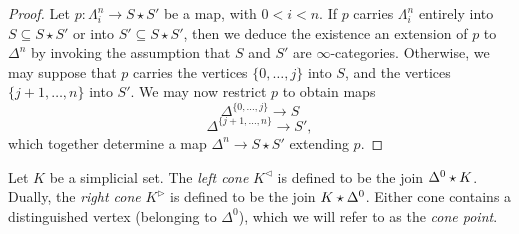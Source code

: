 \begin{1.2.8 Joins of inf-cats}
\begin{proof}
Let $p: \Lambda^n_i \rightarrow S \star S'$ be a map, with $0 < i
< n$. If $p$ carries $\Lambda^n_i$ entirely into $S \subseteq S
\star S'$ or into $S' \subseteq S \star S'$, then we deduce
the existence an extension of $p$ to $\Delta^n$ by invoking
the assumption that $S$ and $S'$ are $\infty$-categories. Otherwise,
we may suppose that $p$ carries the vertices $\{0, \ldots, j\}$
into $S$, and the vertices $\{ j+1, \ldots, n\}$ into $S'$. 
We may now restrict $p$ to obtain maps
$$ \Delta^{ \{ 0, \ldots, j \} } \rightarrow S$$
$$ \Delta^{ \{ j+1, \ldots, n \} } \rightarrow S',$$
which together determine a map $\Delta^n \rightarrow S \star S'$ extending $p$.
\end{proof}

\begin{notation}
Let $K$ be a simplicial set. The {\it left cone} $K^{\triangleleft}$ is defined to be
the join $\Delta^0 \star K$. Dually, the {\it right cone} $K^{\triangleright}$ is defined to be the join $K \star \Delta^0$. Either cone contains a distinguished vertex (belonging to $\Delta^0$), which we will refer to as the {\it cone point}.
\end{notation}
\end{1.2.8 Joins of inf-cats}
